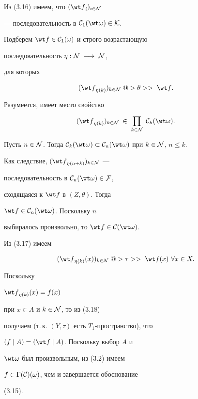 \begin{pf}
Из (3.16) имеем, что $({\wt f}_i)_{i \in {\cal N}}$


--- последовательность в ${{\cal C}_1}(\wt \omega) \in {\cal K}$.


Подберем ${\wt f} \in {{{\cal C}_1}(\omega)}$ и строго возрастающую


последовательность ${\eta}:{\cal N}\;\longrightarrow\;{\cal N}$,


для которых


\begin{equation}


({\wt f}_{{\eta}(k)})_{k \in


{\cal N}}\;@>{\theta}>>\;{\wt f}.


\end{equation}


Разумеется, имеет место свойство


$$


({\wt f}_{{\eta}(k)})_{k \in {\cal N}}\;\in\;\prod_{k \in {\cal N}}\;


{{\cal C}_k}(\wt \omega).


$$


Пусть $n \in {\cal N}$. Тогда ${{\cal C}_k}(\wt \omega) \subset


{{\cal C}_n}(\wt \omega)$ при $k \in {\cal N}$, $n \le k$.


Как следствие, $({\wt f}_{{\eta}(n+k)})_{k \in {\cal N}}$ ---


последовательность в ${{\cal C}_n}(\wt \omega) \in {\cal F}$,


сходящаяся к $\wt f$ в $(Z,\theta)$. Тогда


${\wt f} \in {{\cal C}_n}(\wt \omega)$. Поскольку $n$


выбиралось произвольно, то ${\wt f} \in {{\cal C}(\wt \omega)}$.


Из (3.17) имеем 


\begin{equation}


({{\wt f}_{{\eta}(k)}}(x))_{k \in {\cal N}}\;


@>{\tau}>>\;{\wt f}(x) \ \forall{x} \in X.


\end{equation}


Поскольку


${{\wt f}_{{\eta}(k)}}(x) = {f(x)}$


при $x \in A$ и $k \in {\cal N}$, то из (3.18)


получаем (т.\,к. $(Y,\tau)$ есть $T_1$-пространство), что


$(f \mid A) = ({\wt f} \mid A)$. Поскольку выбор $A$ и


$\wt \omega$ был произвольным, из (3.2) имеем


$f \in {{\Gamma}({\cal C})(\omega)}$, чем и завершается обоснование


(3.15).


\end{pf}





